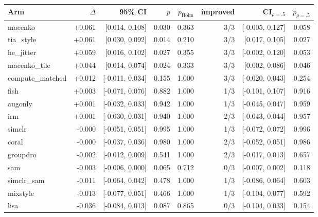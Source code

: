 \begin{tabular}{lrrrrrrr}
\toprule
Arm & $\bar\Delta$ & 95\% CI & $p$ & $p_\text{Holm}$ & improved & CI$_{\rho=.5}$ & $p_{\rho=.5}$ \\
\midrule
macenko & +0.061 & [0.014, 0.108] & 0.030 & 0.363 & 3/3 & [-0.005, 0.127] & 0.058 \\
tia\_style & +0.061 & [0.030, 0.092] & 0.014 & 0.210 & 3/3 & [0.017, 0.105] & 0.027 \\
he\_jitter & +0.059 & [0.016, 0.102] & 0.027 & 0.355 & 3/3 & [-0.002, 0.120] & 0.053 \\
macenko\_tile & +0.044 & [0.014, 0.074] & 0.024 & 0.333 & 3/3 & [0.002, 0.086] & 0.046 \\
compute\_matched & +0.012 & [-0.011, 0.034] & 0.155 & 1.000 & 3/3 & [-0.020, 0.043] & 0.254 \\
fish & +0.003 & [-0.071, 0.076] & 0.882 & 1.000 & 1/3 & [-0.101, 0.107] & 0.916 \\
augonly & +0.001 & [-0.032, 0.033] & 0.942 & 1.000 & 1/3 & [-0.045, 0.047] & 0.959 \\
irm & +0.001 & [-0.030, 0.031] & 0.940 & 1.000 & 2/3 & [-0.043, 0.044] & 0.957 \\
simclr & -0.000 & [-0.051, 0.051] & 0.995 & 1.000 & 1/3 & [-0.072, 0.072] & 0.996 \\
coral & -0.000 & [-0.037, 0.036] & 0.980 & 1.000 & 2/3 & [-0.052, 0.051] & 0.986 \\
groupdro & -0.002 & [-0.012, 0.009] & 0.541 & 1.000 & 2/3 & [-0.017, 0.013] & 0.657 \\
sam & -0.003 & [-0.006, 0.000] & 0.065 & 0.712 & 0/3 & [-0.007, 0.002] & 0.118 \\
simclr\_sam & -0.011 & [-0.064, 0.042] & 0.478 & 1.000 & 1/3 & [-0.086, 0.064] & 0.603 \\
mixstyle & -0.013 & [-0.077, 0.051] & 0.466 & 1.000 & 1/3 & [-0.104, 0.077] & 0.592 \\
lisa & -0.036 & [-0.084, 0.013] & 0.087 & 0.865 & 0/3 & [-0.104, 0.033] & 0.154 \\
\bottomrule
\end{tabular}

